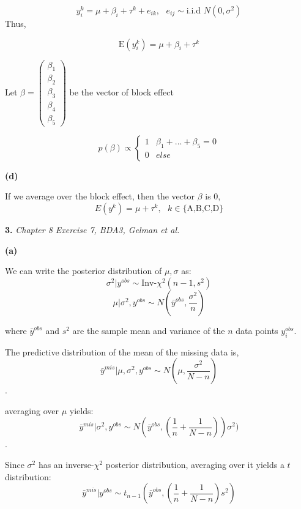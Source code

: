 \documentclass[letterpaper,11pt]{article}
\begin{document}
$$y_{i}^k=\mu+\beta_i+\tau^k+e_{ik},\text{  }e_{ij}\sim \text{i.i.d } N(0,\sigma^2)$$
Thus,

$$\text{E}(y_{i}^k)=\mu+\beta_i+\tau^k$$

Let $\beta=\begin{pmatrix}
	\beta_1\\
	\beta_2\\
	\beta_3\\
	\beta_4\\
	\beta_5
\end{pmatrix}$ be the vector of block effect

$$p(\beta)\propto\begin{cases}
	1 &\beta_1+...+\beta_5=0\\
	0 &else
\end{cases}$$

\begin{addmargin}[-1.1em]{0em} \textbf{(d)}\par \end{addmargin}

If we average over the block effect, then the vector $\beta$ is 0,
$$E(y^{k})=\mu+\tau^k,\text{ } k\in \{\text{A,B,C,D}\}$$


\newpage

\begin{addmargin}[-2em]{0em} \large{\textbf{3. }}\large{\textsl{Chapter 8 Exercise 7, BDA3, Gelman et al.}} \end{addmargin}

\begin{addmargin}[-1.1em]{0em} \textbf{(a)}\par \end{addmargin}

We can write the posterior distribution of $\mu , \sigma$ as:
$$\sigma^2\vert y^{obs} \sim \text{Inv-} \chi^2(n-1,s^2)$$
$$\mu\vert\sigma^2 , y^{obs} \sim N(\bar{y}^{obs},\frac{\sigma^2}{n})$$


where $\bar{y}^{obs}$ and $s^2$ are the sample mean and variance of the $n$ data points $y_i^{obs}$.

The predictive distribution of the mean of the missing data is,
$$\bar{y}^{mis}\vert\mu ,\sigma^2,y^{obs}\sim N(\mu ,\frac{\sigma^2}{N-n})$$.

averaging over $\mu$ yields:
$$\bar{y}^{mis}\vert\sigma^2,y^{obs}\sim N(\bar{y}^{obs},(\frac{1}{n}+\frac{1}{N-n}))\sigma^2)$$.

Since $\sigma^2$ has an inverse-$\chi^2$ posterior distribution, averaging over it yields a $t$ distribution:
$$\bar{y}^{mis}\vert y^{obs}\sim t_{n-1}(\bar{y}^{obs},(\frac{1}{n}+\frac{1}{N-n})s^2)$$
\end{document}
